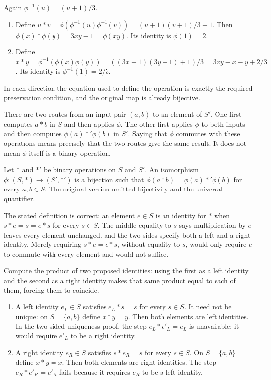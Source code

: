 
Again $\phi^{-1}(u)=(u+1)/3$.
\begin{enumerate}[label=(\alph*)]
\item Define $u*v=\phi(\phi^{-1}(u)\phi^{-1}(v))=(u+1)(v+1)/3-1$. Then $\phi(x)*\phi(y)=3xy-1=\phi(xy)$. Its identity is $\phi(1)=2$.
\item Define $x*y=\phi^{-1}(\phi(x)\phi(y))=((3x-1)(3y-1)+1)/3=3xy-x-y+2/3$. Its identity is $\phi^{-1}(1)=2/3$.
\end{enumerate}
In each direction the equation used to define the operation is exactly the required preservation condition, and the original map is already bijective.


There are two routes from an input pair $(a,b)$ to an element of $S'$. One first computes $a*b$ in $S$ and then applies $\phi$. The other first applies $\phi$ to both inputs and then computes $\phi(a)*'\phi(b)$ in $S'$. Saying that $\phi$ commutes with these operations means precisely that the two routes give the same result. It does not mean $\phi$ itself is a binary operation.


Let $*$ and $*'$ be binary operations on $S$ and $S'$. An isomorphism $\phi:(S,*)\to(S',*')$ is a bijection such that $\phi(a*b)=\phi(a)*'\phi(b)$ for every $a,b\in S$. The original version omitted bijectivity and the universal quantifier.

The stated definition is correct: an element $e\in S$ is an identity for $*$ when $s*e=s=e*s$ for every $s\in S$. The middle equality to $s$ says multiplication by $e$ leaves every element unchanged, and the two sides specify both a left and a right identity. Merely requiring $s*e=e*s$, without equality to $s$, would only require $e$ to commute with every element and would not suffice.


Compute the product of two proposed identities: using the first as a left identity and the second as a right identity makes that same product equal to each of them, forcing them to coincide.


\begin{enumerate}[label=(\alph*)]
\item A left identity $e_L\in S$ satisfies $e_L*s=s$ for every $s\in S$. It need not be unique: on $S=\{a,b\}$ define $x*y=y$. Then both elements are left identities. In the two-sided uniqueness proof, the step $e_L*e'_L=e_L$ is unavailable: it would require $e'_L$ to be a right identity.
\item A right identity $e_R\in S$ satisfies $s*e_R=s$ for every $s\in S$. On $S=\{a,b\}$ define $x*y=x$. Then both elements are right identities. The step $e_R*e'_R=e'_R$ fails because it requires $e_R$ to be a left identity.
\end{enumerate}

